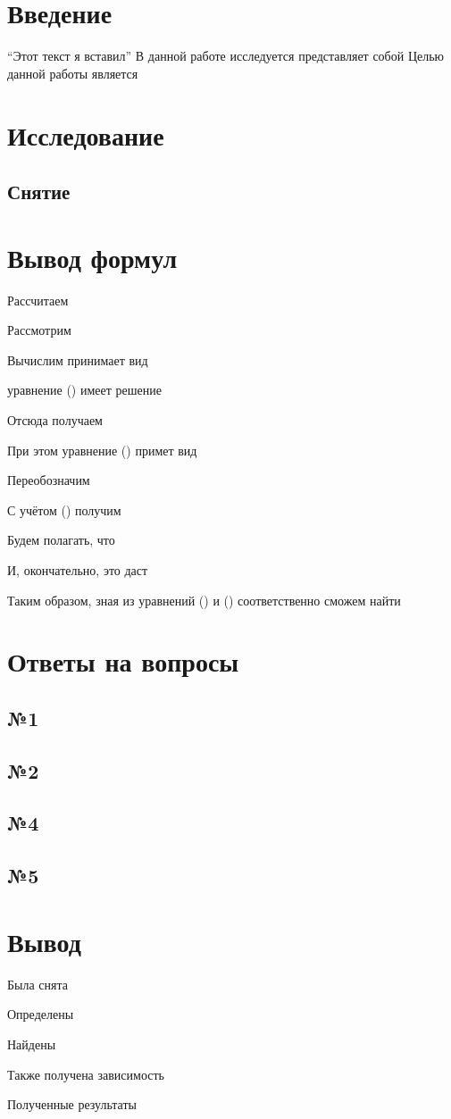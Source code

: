 



\def\labauthors{Понур К.А., Сарафанов Ф.Г., Сидоров Д.А.}
\def\labgroup{420}
\def\labnumber{000}
\def\labtheme{Эффект Холла}



\tableofcontents
\newpage

\section*{Введение}
\label{sec:input}
``Этот текст я вставил''
В данной работе исследуется 
представляет собой
Целью данной работы является 


\newpage
\section{Исследование}
\subsection{Снятие}


\newpage
\section{Вывод формул}
Рассчитаем 

Рассмотрим 

Вычислим
принимает вид

уравнение () имеет решение

Отсюда получаем

При этом уравнение () примет вид

Переобозначим 

С учётом () получим

Будем полагать, что 

И, окончательно, это даст 


Таким образом, зная из уравнений () и () соответственно сможем найти 

\newpage
\section{Ответы на вопросы}

\subsection{№1}
\subsection{№2}
\subsection{№4}
\subsection{№5}


\newpage
\section{Вывод}

Была снята 

Определены 

Найдены 

Также получена зависимость 

Полученные результаты  



